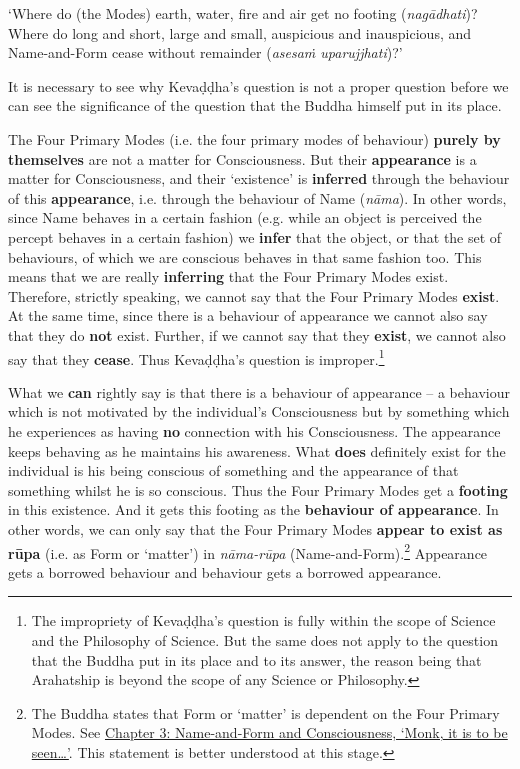 `Where do (the Modes) earth, water, fire and air get no footing (\emph{nagādhati})? Where do long and short, large and small, auspicious and inauspicious, and Name-and-Form cease without remainder (\emph{asesaṁ uparujjhati})?'

It is necessary to see why Kevaḍḍha's question is not a proper question before we can see the significance of the question that the Buddha himself put in its place.

\protect\hypertarget{the-four-primary}{}{}The Four Primary Modes (i.e. the four primary modes of behaviour) \textbf{purely by themselves} are not a matter for Consciousness. But their \textbf{appearance} is a matter for Consciousness, and their `existence' is \textbf{inferred} through the behaviour of this \textbf{appearance}, i.e. through the behaviour of Name (\emph{nāma}). In other words, since Name behaves in a certain fashion (e.g. while an object is perceived the percept behaves in a certain fashion) we \textbf{infer} that the object, or that the set of behaviours, of which we are conscious behaves in that same fashion too. This means that we are really \textbf{inferring} that the Four Primary Modes exist. Therefore, strictly speaking, we cannot say that the Four Primary Modes \textbf{exist}. At the same time, since there is a behaviour of appearance we cannot also say that they do \textbf{not} exist. Further, if we cannot say that they \textbf{exist}, we cannot also say that they \textbf{cease}. Thus Kevaḍḍha's question is improper.\footnote{The impropriety of Kevaḍḍha's question is fully within the scope of Science and the Philosophy of Science. But the same does not apply to the question that the Buddha put in its place and to its answer, the reason being that Arahatship is beyond the scope of any Science or Philosophy.}

What we \textbf{can} rightly say is that there is a behaviour of appearance -- a behaviour which is not motivated by the individual's Consciousness but by something which he experiences as having \textbf{no} connection with his Consciousness. The appearance keeps behaving as he maintains his awareness. What \textbf{does} definitely exist for the individual is his being conscious of something and the appearance of that something whilst he is so conscious. Thus the Four Primary Modes get a \textbf{footing} in this existence. And it gets this footing as the \textbf{behaviour of appearance}. In other words, we can only say that the Four Primary Modes \textbf{appear to exist as rūpa} (i.e. as Form or `matter') in \emph{nāma-rūpa} (Name-and-Form).\footnote{The Buddha states that Form or `matter' is dependent on the Four Primary Modes. See \href{ch-03-name-and-form-and-consciousness.xml\#dependent}{Chapter 3: Name-and-Form and Consciousness, `Monk, it is to be seen\ldots\hspace{0pt}'}. This statement is better understood at this stage.} Appearance gets a borrowed behaviour and behaviour gets a borrowed appearance.

